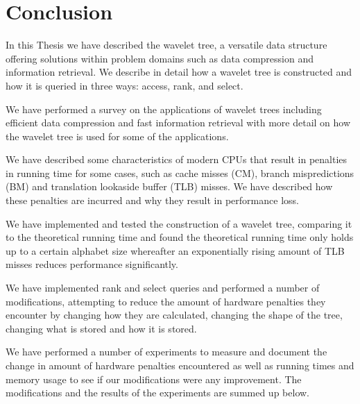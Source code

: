 \section{Conclusion}
In this Thesis we have described the wavelet tree, a versatile data structure offering solutions within problem domains such as data compression and information retrieval.
We describe in detail how a wavelet tree is constructed and how it is queried in three ways: access, rank, and select.

We have performed a survey on the applications of wavelet trees including efficient data compression and fast information retrieval with more detail on how the wavelet tree is used for some of the applications.

We have described some characteristics of modern CPUs that result in penalties in running time for some cases, such as cache misses (CM), branch mispredictions (BM) and translation lookaside buffer (TLB) misses.
We have described how these penalties are incurred and why they result in performance loss.

We have implemented and tested the construction of a wavelet tree, comparing it to the theoretical running time and found the theoretical running time only holds up to a certain alphabet size whereafter an exponentially rising amount of TLB misses reduces performance significantly.

We have implemented rank and select queries and performed a number of modifications, attempting to reduce the amount of hardware penalties they encounter by changing how they are calculated, changing the shape of the tree, changing what is stored and how it is stored.

We have performed a number of experiments to measure and document the change in amount of hardware penalties encountered as well as running times and memory usage to see if our modifications were any improvement.
The modifications and the results of the experiments are summed up below.


